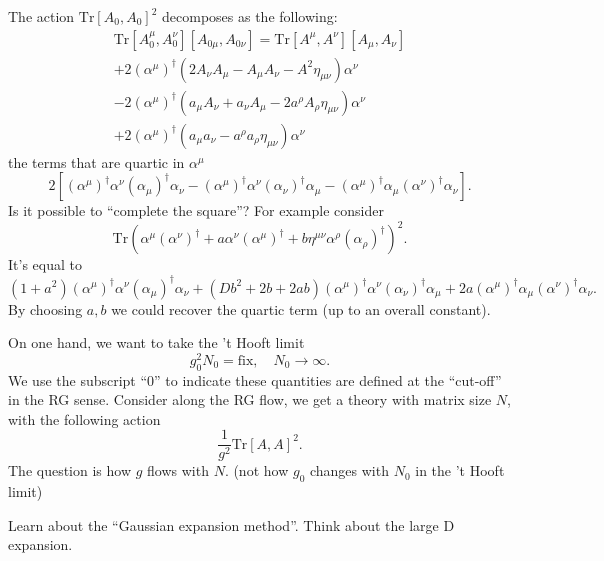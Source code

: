 The action $\mathrm{Tr}[A_0,A_0]^2$ decomposes as the following:
\begin{align*}
	\mathrm{Tr}[A_0^\mu,A_0^\nu][A_{0\mu},A_{0\nu}] = 
	\mathrm{Tr}[A^\mu,A^\nu][A_{\mu},A_{\nu}] 
	\\
	+ 2(\alpha^\mu)^\dagger (2 A_\nu A_\mu - A_\mu A_\nu -  A^2 \eta_{\mu\nu}) \alpha^\nu
	\\
	- 2 (\alpha^\mu)^\dagger (a_\mu A_\nu + a_\nu A_\mu - 2 a^\rho A_\rho \eta_{\mu\nu}) \alpha^\nu
	\\
	+ 2 (\alpha^\mu)^\dagger (a_\mu a_\nu - a^\rho a_\rho \eta_{\mu\nu}) \alpha^\nu
\end{align*}
the terms that are quartic in $\alpha^\mu$
\[
2 \left[	(\alpha^\mu)^\dagger \alpha^\nu (\alpha_\mu)^\dagger \alpha_\nu 
- (\alpha^\mu)^\dagger \alpha^\nu (\alpha_\nu)^\dagger \alpha_\mu
- (\alpha^\mu)^\dagger \alpha_\mu (\alpha^\nu)^\dagger \alpha_\nu \right].
\] 
Is it possible to ``complete the square''?
For example consider
\[
\mathrm{Tr} \left( \alpha^\mu (\alpha^\nu)^\dagger
 + a \alpha^\nu (\alpha^\mu)^\dagger
+ b \eta^{\mu\nu} \alpha^\rho (\alpha_\rho)^\dagger\right)^2
.\]
It's equal to
\[
	(1+a^2) (\alpha^\mu)^\dagger \alpha^\nu (\alpha_\mu)^\dagger \alpha_\nu
	+ (D b^2 + 2 b + 2 a b) (\alpha^\mu)^\dagger \alpha^\nu (\alpha_\nu)^\dagger \alpha_\mu
	+ 2a (\alpha^\mu)^\dagger \alpha_\mu (\alpha^\nu)^\dagger \alpha_\nu
.\] 
By choosing $a,b$ we could recover the quartic term (up to an overall constant).

\begin{problem}
	On one hand, we want to take the 't Hooft limit
	\[
		g_0^2 N_0 = \text{fix},\quad N_0\to\infty
	.\] 
	We use the subscript ``0'' to indicate these quantities are defined at the ``cut-off'' in the RG sense.
	Consider along the RG flow, we get a theory with matrix size $N$,
	with the following action
	\[
		\frac{1}{g^2} \mathrm{Tr} [A,A]^2
	.\] 
	The question is how $g$ flows with $N$.
	(not how $g_0$ changes with $N_0$ in the 't Hooft limit)
\end{problem}

\begin{todo}
	Learn about the ``Gaussian expansion method''.
	Think about the large D expansion.
\end{todo}
